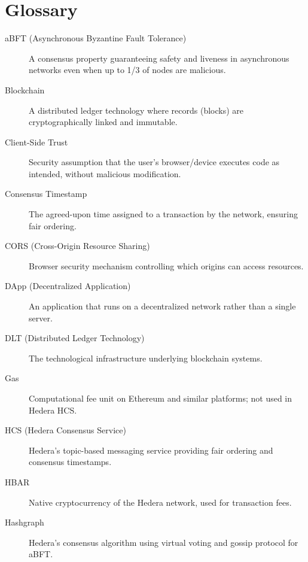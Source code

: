 \chapter{Glossary}
\label{app:glossary}

\begin{description}
\item[aBFT (Asynchronous Byzantine Fault Tolerance)] A consensus property guaranteeing safety and liveness in asynchronous networks even when up to 1/3 of nodes are malicious.

\item[Blockchain] A distributed ledger technology where records (blocks) are cryptographically linked and immutable.

\item[Client-Side Trust] Security assumption that the user's browser/device executes code as intended, without malicious modification.

\item[Consensus Timestamp] The agreed-upon time assigned to a transaction by the network, ensuring fair ordering.

\item[CORS (Cross-Origin Resource Sharing)] Browser security mechanism controlling which origins can access resources.

\item[DApp (Decentralized Application)] An application that runs on a decentralized network rather than a single server.

\item[DLT (Distributed Ledger Technology)] The technological infrastructure underlying blockchain systems.

\item[Gas] Computational fee unit on Ethereum and similar platforms; not used in Hedera HCS.

\item[HCS (Hedera Consensus Service)] Hedera's topic-based messaging service providing fair ordering and consensus timestamps.

\item[HBAR] Native cryptocurrency of the Hedera network, used for transaction fees.

\item[Hashgraph] Hedera's consensus algorithm using virtual voting and gossip protocol for aBFT.


\end{description}
